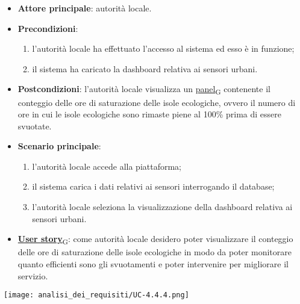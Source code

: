 \begin{itemize}
	\item \textbf{Attore principale}: autorità locale.
	\item \textbf{Precondizioni}:
	      \begin{enumerate}
		      \item l'autorità locale ha effettuato l'accesso al sistema ed esso è in funzione;
		      \item il sistema ha caricato la dashboard relativa ai sensori urbani.
	      \end{enumerate}
	\item \textbf{Postcondizioni}: l'autorità locale visualizza un \href{https://7last.github.io/docs/pb/documentazione-interna/glossario\#panel}{panel\textsubscript{G}} contenente il conteggio delle ore di saturazione delle isole ecologiche,
	      ovvero il numero di ore in cui le isole ecologiche sono rimaste piene al 100\% prima di essere svuotate.
	\item \textbf{Scenario principale}:
	      \begin{enumerate}
		      \item l'autorità locale accede alla piattaforma;
		      \item il sistema carica i dati relativi ai sensori interrogando il database;
		      \item l'autorità locale seleziona la visualizzazione della dashboard relativa ai sensori urbani.
	      \end{enumerate}
	\item \href{https://7last.github.io/docs/pb/documentazione-interna/glossario\#user-story}{\textbf{User story}\textsubscript{G}}:
	      come autorità locale desidero poter visualizzare il conteggio delle ore di saturazione delle isole ecologiche in modo da poter monitorare
	      quanto efficienti sono gli svuotamenti e poter intervenire per migliorare il servizio.
\end{itemize}
\begin{center}
	\texttt{[image: analisi\_dei\_requisiti/UC-4.4.4.png]}
\end{center}


